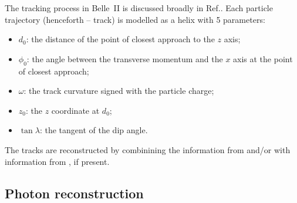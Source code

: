 The tracking process in Belle~II is discussed broadly in Ref.\cite{BelleIITrackingGroup:2020hpx}.
Each particle trajectory (henceforth -- track) is modelled as a helix with 5 parameters:
\begin{itemize}
    \item $d_0$: the distance of the point of closest approach to the $z$ axis;
    \item $\phi_0$: the angle between the transverse momentum and the $x$ axis at the point of closest approach;
    \item $\omega$: the track curvature signed with the particle charge;
    \item $z_0$: the $z$ coordinate at $d_0$;
    \item $\tan\lambda$: the tangent of the dip angle.
\end{itemize}

The tracks are reconstructed by combinining the information from \CDC and/or \SVD with information from \PXD, if present.

\subsection{Photon reconstruction}\label{sec:neutrals}

